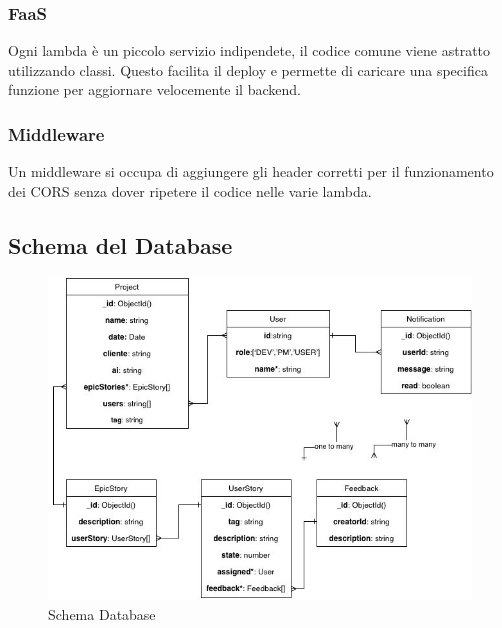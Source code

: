\documentclass{article}
\begin{document}
\subsubsection{FaaS}
Ogni lambda è un piccolo servizio indipendete, il codice comune viene astratto utilizzando classi. Questo facilita il deploy e permette di caricare una specifica funzione per aggiornare velocemente il backend.
\subsubsection{Middleware}
Un middleware si occupa di aggiungere gli header corretti per il funzionamento dei CORS senza dover ripetere il codice nelle varie lambda.
\subsection{Schema del Database}
\begin{figure}[H]
      \centering
      \includegraphics[width=\textwidth]{documenti/Screenshot manuale utente/UMLDB.png}
      \caption{Schema Database}
      \label{fig: archser}
    \end{figure}
\end{document}
